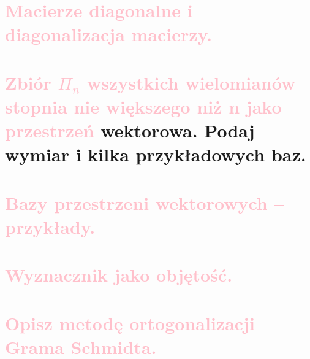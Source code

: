 \section{\textcolor{pink}{Macierze diagonalne i diagonalizacja macierzy.}}

\section{\textcolor{pink}{Zbiór \texorpdfstring{\(\Pi_n\)}{Πn} wszystkich wielomianów stopnia nie większego niż n jako przestrzeń}
wektorowa. Podaj wymiar i kilka przykładowych baz.}


\section{\textcolor{pink}{Bazy przestrzeni wektorowych -- przykłady.}}

\section{\textcolor{pink}{Wyznacznik jako objętość.}}

\section{\textcolor{pink}{Opisz metodę ortogonalizacji Grama Schmidta.}}